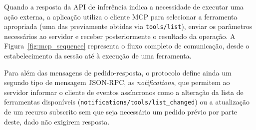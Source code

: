 Quando a resposta da API de inferência indica a necessidade de executar uma
ação externa, a aplicação utiliza o cliente MCP para selecionar a ferramenta
apropriada (uma das previamente obtidas via \texttt{tools/list}), enviar
os parâmetros necessários ao servidor e receber posteriormente o resultado da
operação. A Figura~\ref{fig:mcp_sequence} representa o fluxo completo de
comunicação, desde o estabelecimento da sessão até à execução de uma
ferramenta.

Para além das mensagens de pedido-resposta, o protocolo define ainda um
segundo tipo de mensagem JSON-RPC, as \textit{notifications}, que permitem ao
servidor informar o cliente de eventos assíncronos como a alteração da
lista de ferramentas disponíveis (\texttt{notifications/tools/list\_changed})
ou a atualização de um recurso subscrito  sem que seja necessário um pedido
prévio por parte deste, dado não exigirem resposta.
